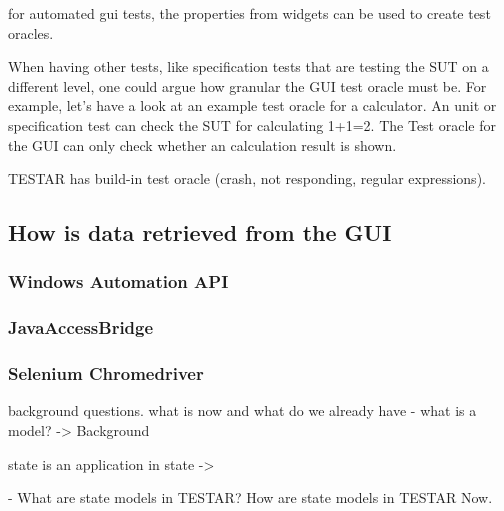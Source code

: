 for automated gui tests, the properties from widgets can be used to create test oracles. 

When having other tests, like specification tests that are testing the SUT on a different level, one could argue how granular the GUI test oracle must be. For example, let's have a look at an example test oracle for a calculator. An unit or specification test can check the SUT for calculating 1+1=2. The Test oracle for the GUI can only check whether an calculation result is shown.  

TESTAR has build-in test oracle (crash, not responding, regular expressions).  

\subsection{How is data retrieved from the GUI}
\subsubsection{Windows Automation API}
\subsubsection{JavaAccessBridge}
\subsubsection{Selenium Chromedriver}

background questions. what is now and what do we already have
- what is a model? -> Background

state is an application in state -> 

- What are state models in TESTAR?
How are state models in TESTAR Now.
